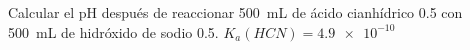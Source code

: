 Calcular el pH después de reaccionar \SI{500}{\milli\liter} de ácido cianhídrico \SI{0,5}{\Molar} con \SI{500}{\milli\liter} de hidróxido de sodio \SI{0,5}{\Molar}. $K_a(HCN) = \num{4,9e-10}$
